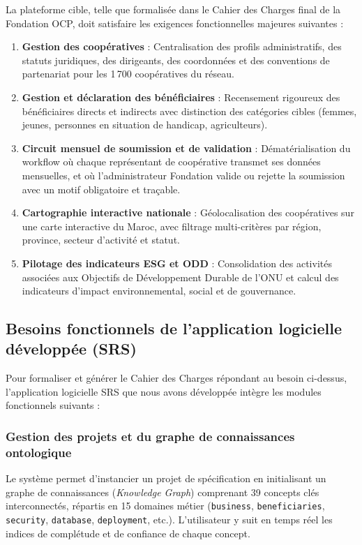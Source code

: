 La plateforme cible, telle que formalisée dans le Cahier des Charges final de la Fondation OCP, doit satisfaire les exigences fonctionnelles majeures suivantes :
\begin{enumerate}
    \item \textbf{Gestion des coopératives} : Centralisation des profils administratifs, des statuts juridiques, des dirigeants, des coordonnées et des conventions de partenariat pour les 1\,700 coopératives du réseau.
    \item \textbf{Gestion et déclaration des bénéficiaires} : Recensement rigoureux des bénéficiaires directs et indirects avec distinction des catégories cibles (femmes, jeunes, personnes en situation de handicap, agriculteurs).
    \item \textbf{Circuit mensuel de soumission et de validation} : Dématérialisation du workflow où chaque représentant de coopérative transmet ses données mensuelles, et où l'administrateur Fondation valide ou rejette la soumission avec un motif obligatoire et traçable.
    \item \textbf{Cartographie interactive nationale} : Géolocalisation des coopératives sur une carte interactive du Maroc, avec filtrage multi-critères par région, province, secteur d'activité et statut.
    \item \textbf{Pilotage des indicateurs ESG et ODD} : Consolidation des activités associées aux Objectifs de Développement Durable de l'ONU et calcul des indicateurs d'impact environnemental, social et de gouvernance.
\end{enumerate}

\subsection{Besoins fonctionnels de l'application logicielle développée (SRS)}

Pour formaliser et générer le Cahier des Charges répondant au besoin ci-dessus, l'application logicielle SRS que nous avons développée intègre les modules fonctionnels suivants :

\subsubsection{Gestion des projets et du graphe de connaissances ontologique}
Le système permet d'instancier un projet de spécification en initialisant un graphe de connaissances (\textit{Knowledge Graph}) comprenant 39 concepts clés interconnectés, répartis en 15 domaines métier (\texttt{business}, \texttt{beneficiaries}, \texttt{security}, \texttt{database}, \texttt{deployment}, etc.). L'utilisateur y suit en temps réel les indices de complétude et de confiance de chaque concept.

